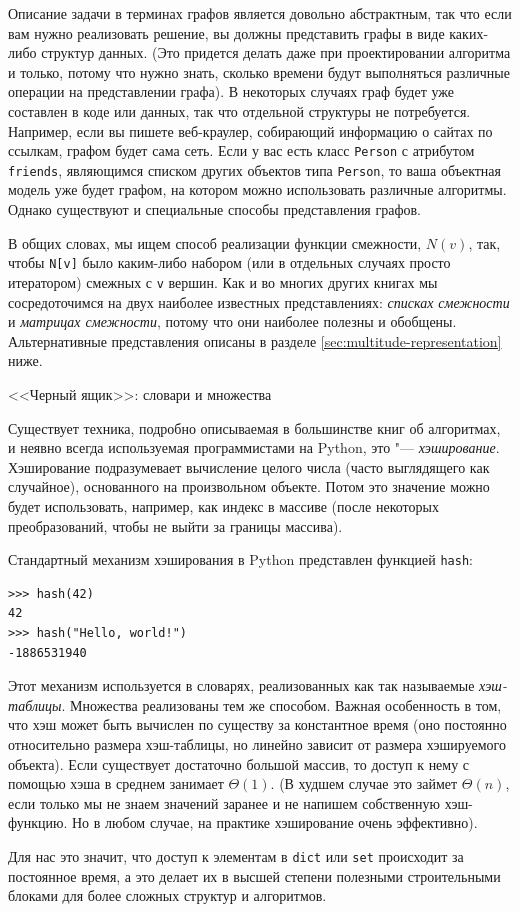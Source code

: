 Описание задачи в терминах графов является довольно абстрактным, так что если вам нужно реализовать решение, вы должны представить графы в виде каких-либо структур данных. (Это придется делать даже при проектировании алгоритма и только, потому что нужно знать, сколько времени будут выполняться различные операции на представлении графа). В некоторых случаях граф будет уже составлен в коде или данных, так что отдельной структуры не потребуется. Например, если вы пишете веб-краулер, собирающий информацию о сайтах по ссылкам, графом будет сама сеть. Если у вас есть класс \texttt{Person} с атрибутом \texttt{friends}, являющимся списком других объектов типа \texttt{Person}, то ваша объектная модель уже будет графом, на котором можно использовать различные алгоритмы. Однако существуют и специальные способы представления графов.

В общих словах, мы ищем способ реализации функции смежности, $N(v)$, так, чтобы \texttt{N[v]} было каким-либо набором (или в отдельных случаях просто итератором) смежных с \texttt{v} вершин. Как и во многих других книгах мы сосредоточимся на двух наиболее известных представлениях: \textit{списках смежности} и \textit{матрицах смежности}, потому что они наиболее полезны и обобщены. Альтернативные представления описаны в разделе \ref{sec:multitude-representation} ниже.

\begin{notice}{<<Черный ящик>>: словари и множества}

Существует техника, подробно описываемая в большинстве книг об алгоритмах, и неявно всегда используемая программистами на Python, это "--- \textit{хэширование}. Хэширование подразумевает вычисление целого числа (часто выглядящего как случайное), основанного на произвольном объекте. Потом это значение можно будет использовать, например, как индекс в массиве (после некоторых преобразований, чтобы не выйти за границы массива).

Стандартный механизм хэширования в Python представлен функцией \texttt{hash}:
\begin{lstlisting}
>>> hash(42)
42
>>> hash("Hello, world!")
-1886531940
\end{lstlisting}

Этот механизм используется в словарях, реализованных как так называемые \textit{хэш-таблицы}. Множества реализованы тем же способом. Важная особенность в том, что хэш может быть вычислен по существу за константное время (оно постоянно относительно размера хэш-таблицы, но линейно зависит от размера хэшируемого объекта). Если существует достаточно большой массив, то доступ к нему с помощью хэша в среднем занимает $\Theta(1)$. (В худшем случае это займет $\Theta(n)$, если только мы не знаем значений заранее и не напишем собственную хэш-функцию. Но в любом случае, на практике хэширование очень эффективно). 

Для нас это значит, что доступ к элементам в \texttt{dict} или \texttt{set} происходит за постоянное время, а это делает их в высшей степени полезными строительными блоками для более сложных структур и алгоритмов.
\end{notice}


